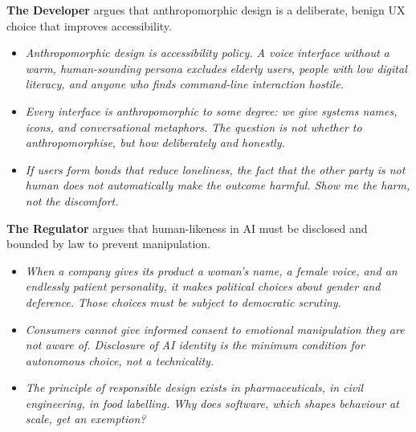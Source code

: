 

\medskip
\noindent\textbf{The Developer} argues that anthropomorphic design is a deliberate, benign UX choice that improves accessibility.
    \begin{itemize}
        \item \textit{Anthropomorphic design is accessibility policy. A voice
        interface without a warm, human-sounding persona excludes elderly
        users, people with low digital literacy, and anyone who finds
        command-line interaction hostile.}
        \item \textit{Every interface is anthropomorphic to some degree:
        we give systems names, icons, and conversational metaphors. The
        question is not whether to anthropomorphise, but how deliberately
        and honestly.}
        \item \textit{If users form bonds that reduce loneliness, the fact
        that the other party is not human does not automatically make the
        outcome harmful. Show me the harm, not the discomfort.}
    \end{itemize}

\medskip
\noindent\textbf{The Regulator} argues that human-likeness in AI
    must be disclosed and bounded by law to prevent manipulation.
    \begin{itemize}
        \item \textit{When a company gives its product a woman's name, a
        female voice, and an endlessly patient personality, it makes
        political choices about gender and deference. Those choices must be
        subject to democratic scrutiny.}
        \item \textit{Consumers cannot give informed consent to emotional
        manipulation they are not aware of. Disclosure of AI identity is the
        minimum condition for autonomous choice, not a technicality.}
        \item \textit{The principle of responsible design exists in
        pharmaceuticals, in civil engineering, in food labelling. Why does
        software, which shapes behaviour at scale, get an exemption?}
    \end{itemize}


